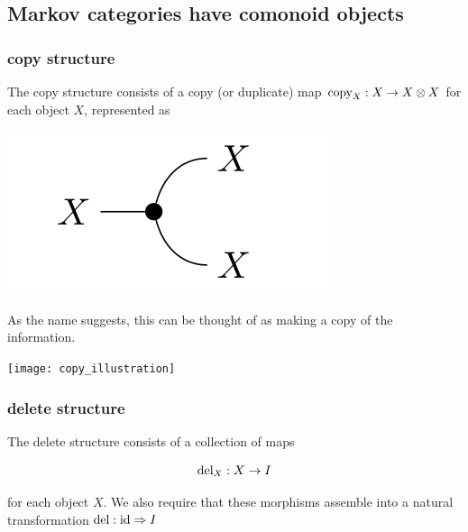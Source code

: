 \subsection{Markov categories have comonoid objects}
\begin{frame}
    \frametitle{copy structure}
    \begin{minipage}{.57\textwidth}
        The copy structure consists of a copy (or duplicate) map ${\text{\normalfont copy} _X: X\to X\otimes X}$ for each object $X$, represented as

        \begin{center}
            \includegraphics[width=.4\textwidth]{graphics/string/markov_copy.png}
        \end{center}

        As the name suggests, this can be thought of as making a copy of the information.
    \end{minipage}\pause
    \hfill
    \begin{minipage}{.38\textwidth}
        \texttt{[image: copy\_illustration]}
    \end{minipage}
\end{frame}


\begin{frame}
    \frametitle{delete structure}
    The delete structure consists of a collection of maps
    \begin{minipage}{.48\textwidth}
        \[
            \text{\normalfont del} _X : X\to I
        \]
    \end{minipage}
    \hfill %
    \begin{minipage}{.48\textwidth}
    \end{minipage}
    \vspace{5mm}

    for each object $X$. We also require that these morphisms assemble into a natural transformation $\text{\normalfont del} : \text{\normalfont id} \Rightarrow I$
\end{frame}

